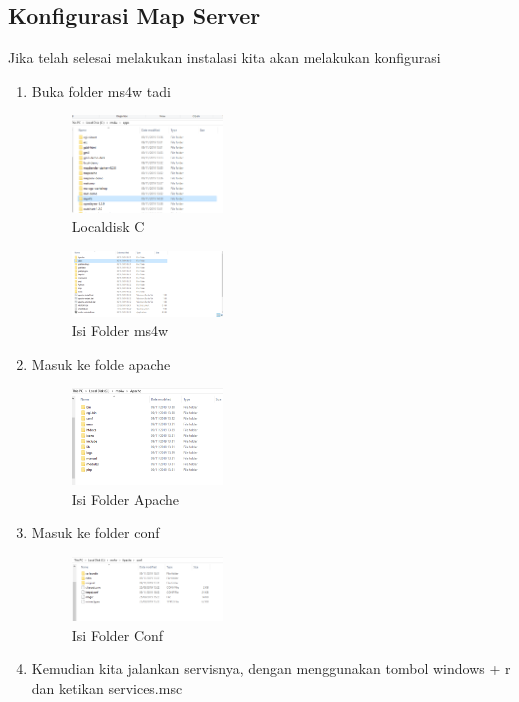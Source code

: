 \subsection{Konfigurasi Map Server}
Jika telah selesai melakukan instalasi kita akan melakukan konfigurasi
\begin{enumerate}
  \item Buka folder ms4w tadi
  \hfill\break
    \begin{figure}[H]
		\includegraphics[width=4cm]{figures/1174095/4/Conf1.png}
		\centering
		\caption{Localdisk C}
    \end{figure}
    \hfill\break
    \begin{figure}[H]
		\includegraphics[width=4cm]{figures/1174095/4/Conf2.png}
		\centering
		\caption{Isi Folder ms4w}
    \end{figure}
  \item Masuk ke folde apache
  \hfill\break
    \begin{figure}[H]
		\includegraphics[width=4cm]{figures/1174095/4/Conf3.png}
		\centering
		\caption{Isi Folder Apache}
    \end{figure}
  \item Masuk ke folder conf
  \hfill\break
    \begin{figure}[H]
		\includegraphics[width=4cm]{figures/1174095/4/Conf4.png}
		\centering
		\caption{Isi Folder Conf}
    \end{figure}
  \item Kemudian kita jalankan servisnya, dengan menggunakan tombol windows + r dan ketikan services.msc

\end{enumerate}
